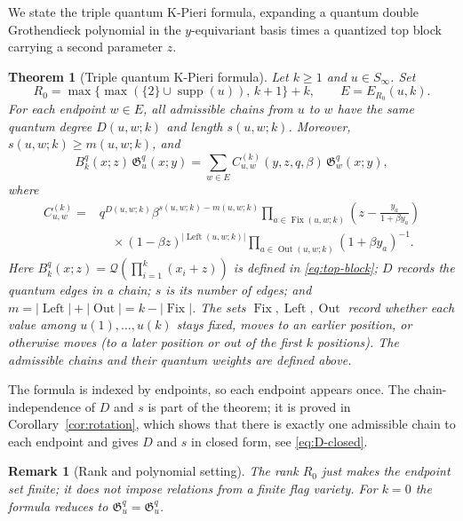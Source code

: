 \documentclass[11pt]{article}
\newtheorem{theorem}[proposition]{Theorem}
\newtheorem{remark}[proposition]{Remark}
\newcommand{\G}{\mathfrak{G}}
\newcommand{\Q}{\mathcal{Q}}
\newcommand{\Fix}{\operatorname{Fix}}
\newcommand{\Left}{\operatorname{Left}}
\newcommand{\Out}{\operatorname{Out}}
\DeclareMathOperator{\supp}{supp}
\begin{document}
 We state the triple quantum K-Pieri formula, expanding a quantum
 double Grothendieck polynomial in the $y$-equivariant basis times a
 quantized top block carrying a second parameter $z$.

 \begin{theorem}[Triple quantum K-Pieri formula]
\label{prop:top}
 Let $k\geq1$ and $u\in S_\infty$. Set
 \[
  R_0=\max\{\max(\{2\}\cup\supp(u)),\,k+1\}+k,
  \qquad E=E_{R_0}(u,k).
 \]
 For each endpoint $w\in E$, all admissible chains from $u$ to $w$
 have the same quantum degree $D(u,w;k)$ and length $s(u,w;k)$.
 Moreover, $s(u,w;k)\geq m(u,w;k)$, and
 \begin{equation}\label{eq:main}
   B_k^q(x;z)\,\G_u^q(x;y)
     =\sum_{w\in E}
        C_{u,w}^{(k)}(y,z,q,\beta)\,\G_w^q(x;y),
 \end{equation}
 where
 \begin{equation}\label{eq:coefficient}
 \boxed{\begin{aligned}
 C_{u,w}^{(k)}
   ={}&q^{D(u,w;k)}\beta^{s(u,w;k)-m(u,w;k)}
       \prod_{a\in\Fix(u,w;k)}
          \left(z-\frac{y_a}{1+\beta y_a}\right)\\
     &\quad{}\times(1-\beta z)^{|\Left(u,w;k)|}
       \prod_{a\in\Out(u,w;k)}(1+\beta y_a)^{-1}.
 \end{aligned}}
 \end{equation}
 Here $B_k^q(x;z)=\Q(\prod_{i=1}^k(x_i+z))$ is defined in
 \eqref{eq:top-block}; $D$ records the quantum edges in a chain;
 $s$ is its number of edges; and
 $m=|\Left|+|\Out|=k-|\Fix|$. The sets $\Fix,\Left,\Out$ record
  whether each value among $u(1),\ldots,u(k)$ stays fixed, moves to an
  earlier position, or otherwise moves (to a later position or out of
  the first $k$ positions). The admissible chains and their quantum
  weights are defined above.
 \end{theorem}

 The formula is indexed by endpoints, so each endpoint appears once.
 The chain-independence of $D$ and $s$ is part of the theorem; it is
 proved in Corollary~\ref{cor:rotation}, which shows that there is
 exactly one admissible chain to each endpoint and gives
 $D$ and $s$ in closed form, see \eqref{eq:D-closed}.

 \begin{remark}[Rank and polynomial setting]
 The rank $R_0$ just makes the endpoint set finite; it does not impose
 relations from a finite flag variety. For $k=0$ the formula reduces
 to $\G_u^q=\G_u^q$.
 \end{remark}
\end{document}
